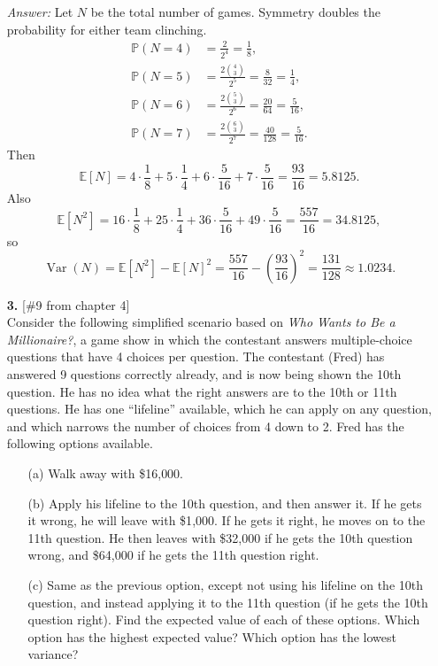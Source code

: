 \documentclass{article}
\begin{document}
\begin{enumerate}
\medskip
\noindent\textit{Answer:}
Let $N$ be the total number of games. Symmetry doubles the probability for either team clinching.
\[
\begin{aligned}
\mathbb{P}(N=4) &= \frac{2}{2^4}=\frac{1}{8},\\
\mathbb{P}(N=5) &= \frac{2\binom{4}{3}}{2^5}=\frac{8}{32}=\frac{1}{4},\\
\mathbb{P}(N=6) &= \frac{2\binom{5}{3}}{2^6}=\frac{20}{64}=\frac{5}{16},\\
\mathbb{P}(N=7) &= \frac{2\binom{6}{3}}{2^7}=\frac{40}{128}=\frac{5}{16}.
\end{aligned}
\]
Then
\[
\mathbb{E}[N]=4\cdot\frac18+5\cdot\frac14+6\cdot\frac{5}{16}+7\cdot\frac{5}{16}
=\boxed{\frac{93}{16}=5.8125}.
\]
Also
\[
\mathbb{E}[N^2]=16\cdot\frac18+25\cdot\frac14+36\cdot\frac{5}{16}+49\cdot\frac{5}{16}
=\frac{557}{16}=34.8125,
\]
so
\[
\operatorname{Var}(N)=\mathbb{E}[N^2]-\mathbb{E}[N]^2
=\frac{557}{16}-\left(\frac{93}{16}\right)^2
=\boxed{\frac{131}{128}\approx 1.0234}.
\]

\bigskip

\item[\textbf{3.}] [\#9 from chapter 4]\\
Consider the following simplified scenario based on \textit{Who Wants to Be a Millionaire?}, a game show in which the contestant answers multiple-choice questions that have 4 choices per question.
The contestant (Fred) has answered 9 questions correctly already, and is now being shown the 10th question.
He has no idea what the right answers are to the 10th or 11th questions.
He has one “lifeline” available, which he can apply on any question, and which narrows the number of choices from 4 down to 2.
Fred has the following options available.

\begin{enumerate}
    \item[(a)] Walk away with \$16{,}000.

    \item[(b)] Apply his lifeline to the 10th question, and then answer it.
    If he gets it wrong, he will leave with \$1{,}000.
    If he gets it right, he moves on to the 11th question.
    He then leaves with \$32{,}000 if he gets the 10th question wrong, and \$64{,}000 if he gets the 11th question right.

    \item[(c)] Same as the previous option, except not using his lifeline on the 10th question, and instead applying it to the 11th question (if he gets the 10th question right).
    Find the expected value of each of these options.
    Which option has the highest expected value? Which option has the lowest variance?
\end{enumerate}


\end{enumerate}
\end{document}
